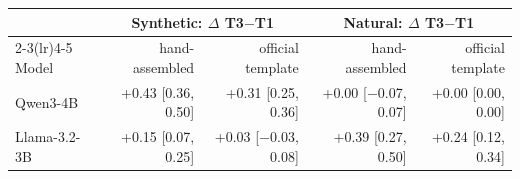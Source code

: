 \begin{tabular}{lrrrr}
\toprule
& \multicolumn{2}{c}{Synthetic: $\Delta$ T3$-$T1} & \multicolumn{2}{c}{Natural: $\Delta$ T3$-$T1} \\
\cmidrule(lr){2-3}\cmidrule(lr){4-5}
Model & hand-assembled & official template & hand-assembled & official template \\
\midrule
Qwen3-4B & +0.43 [0.36, 0.50] & +0.31 [0.25, 0.36] & +0.00 [$-$0.07, 0.07] & +0.00 [0.00, 0.00] \\
Llama-3.2-3B & +0.15 [0.07, 0.25] & +0.03 [$-$0.03, 0.08] & +0.39 [0.27, 0.50] & +0.24 [0.12, 0.34] \\
\bottomrule
\end{tabular}
